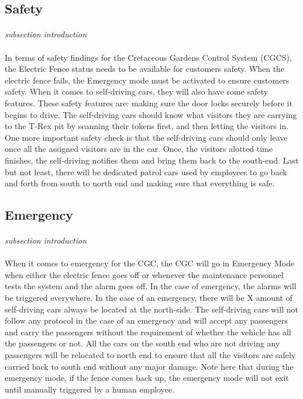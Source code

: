 \documentclass[12pt]{article}
\begin{document}
    \subsection{Safety}
    \paragraph{} \textit{subsection introduction}
    \paragraph{} In terms of safety findings for the Cretaceous Gardens Control System (CGCS), the Electric Fence status needs to be available for customers safety. When the
electric fence fails, the Emergency mode must be activated to ensure customers safety. When it comes to self-driving cars, they will also have some safety
features. These safety features are: making sure the door locks securely before it begins to drive. The self-driving cars should know what visitors they are
carrying to the T-Rex pit by scanning their tokens first, and then letting the visitors in. One more important safety check is that the self-driving cars
should only leave once all the assigned visitors are in the car. Once, the visitors alotted time finishes, the self-driving notifies them and bring them
back to the south-end. Last but not least, there will be dedicated patrol cars used by employees to go back and forth from south to north end and making 
sure that everything is safe.  

    \subsection{Emergency}
    \paragraph{} \textit{subsection introduction}
    \paragraph{} When it comes to emergency for the CGC, the CGC will go in Emergency Mode when either the electric fence goes off or whenever the maintenance personnel 
tests the system and the alarm goes off. In the case of emergency, the alarms will be triggered everywhere. In the case of an emergency, there will be X
amount of self-driving cars always be located at the north-side. The self-driving cars will not follow any protocol in the case of an emergency and will 
accept any passengers and carry the passengers without the requirement of whether the vehicle has all the passengers or not. All the cars on the south end 
who are not driving any passengers will be relocated to north end to ensure that all the visitors are safely carried back to south end without any 
major damage. Note here that during the emergency mode, if the fence comes back up, the emergency mode will not exit until manually triggered by a
human employee.
    
\end{document}
